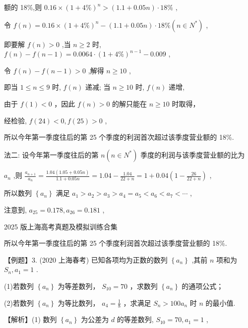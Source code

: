 \documentclass[10pt]{article}
\begin{document}
额的 18\%,则 \({0.16} \times  {\left( 1 + 4\% \right) }^{n} > \left( {{1.1} + {0.05n}}\right)  \cdot  {18}\%\) ,

令 \(f\left( n\right)  = {0.16} \times  {\left( 1 + 4\% \right) }^{n} - \left( {{1.1} + {0.05n}}\right)  \cdot  {18}\% \left( {n \in  {N}^{ * }}\right)\) ,

即要解 \(f\left( n\right)  > 0\) ,当 \(n \geq  2\) 时, \(f\left( n\right)  - f\left( {n - 1}\right)  = {0.0064} \cdot  {\left( 1 + 4\% \right) }^{n - 1} - {0.009}\) ,

令 \(f\left( n\right)  - f\left( {n - 1}\right)  > 0\) ,解得 \(n \geq  {10}\) ,

即当 \(1 \leq  n \leq  9\) 时, \(f\left( n\right)\) 递减; 当 \(n \geq  {10}\) 时, \(f\left( n\right)\) 递增,

由于 \(f\left( 1\right)  < 0\) ，因此 \(f\left( n\right)  > 0\) 的解只能在 \(n \geq  {10}\) 时取得，

经检验, \(f\left( {24}\right)  < 0,f\left( {25}\right)  > 0\) ,

所以今年第一季度往后的第 25 个季度的利润首次超过该季度营业额的 18\%.

法二: 设今年第一季度往后的第 \(n\left( {n \in  {N}^{ * }}\right)\) 季度的利润与该季度营业额的比为

\({a}_{n}\) ,则 \(\frac{{a}_{n + 1}}{{a}_{n}} = \frac{{1.04}\left( {{1.05} + {0.05n}}\right) }{{1.1} + {0.05n}} = {1.04} - \frac{1.04}{{22} + n} = 1 + {0.04}\left( {1 - \frac{26}{{22} + n}}\right)\) ,

所以数列 \(\left\{  {a}_{n}\right\}\) 满足 \({a}_{1} > {a}_{2} > {a}_{3} > {a}_{4} = {a}_{5} < {a}_{6} < {a}_{7} < \cdots\) ,

注意到, \({a}_{25} = {0.178},{a}_{26} = {0.181}\) ,

2025 版上海高考真题及模拟训练合集

所以今年第一季度往后的第 25 个季度利润首次超过该季度营业额的 18\%.

【例题】3. (2020 上海春考) 已知各项均为正数的数列 \(\left\{  {a}_{n}\right\}\) ,其前 \(n\) 项和为 \({S}_{n},{a}_{1} = 1\) .

(1)若数列 \(\left\{  {a}_{n}\right\}\) 为等差数列， \({S}_{10} = {70}\) ，求数列 \(\left\{  {a}_{n}\right\}\) 的通项公式；

(2)若数列 \(\left\{  {a}_{n}\right\}\) 为等比数列， \({a}_{4} = \frac{1}{8}\) ，求满足 \({S}_{n} > {{100}{a}_{n}}\) 时 \(n\) 的最小值.

【解析】(1) 数列 \(\left\{  {a}_{n}\right\}\) 为公差为 \(d\) 的等差数列, \({S}_{10} = {70},{a}_{1} = 1\) ,
\end{document}
